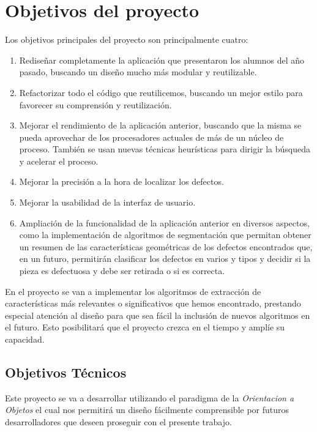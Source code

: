 \chapter{Objetivos del proyecto}

Los objetivos principales del proyecto son principalmente cuatro:
\begin{enumerate}
 \item Rediseñar completamente la aplicación que presentaron los alumnos del año pasado, buscando un diseño mucho más modular y reutilizable.
 \item Refactorizar todo el código que reutilicemos, buscando un mejor estilo para favorecer su comprensión y reutilización.
 \item Mejorar el rendimiento de la aplicación anterior, buscando que la misma se pueda aprovechar de los procesadores actuales de más de un núcleo de proceso. También se usan nuevas técnicas heurísticas para dirigir la búsqueda y acelerar el proceso.
 \item Mejorar la precisión a la hora de localizar los defectos.
 \item Mejorar la usabilidad de la interfaz de usuario.
 \item Ampliación de la funcionalidad de la aplicación anterior en diversos aspectos, como la implementación de algoritmos de segmentación que permitan obtener un resumen de las características geométricas de los defectos encontrados que, en un futuro, permitirán clasificar los defectos en varios y tipos y decidir si la pieza es defectuosa y debe ser retirada o si es correcta.
\end{enumerate}

En el proyecto se van a implementar los algoritmos de extracción de características más relevantes o significativos que hemos encontrado, prestando especial atención al diseño para que sea fácil la inclusión de nuevos algoritmos en el futuro. Esto posibilitará que el proyecto crezca en el tiempo y amplíe su capacidad.

\section{Objetivos Técnicos}
Este proyecto se va a desarrollar utilizando el paradigma de la \textit{Orientacion a Objetos} el cual nos permitirá un diseño fácilmente comprensible por futuros desarrolladores que deseen proseguir con el presente trabajo. 

